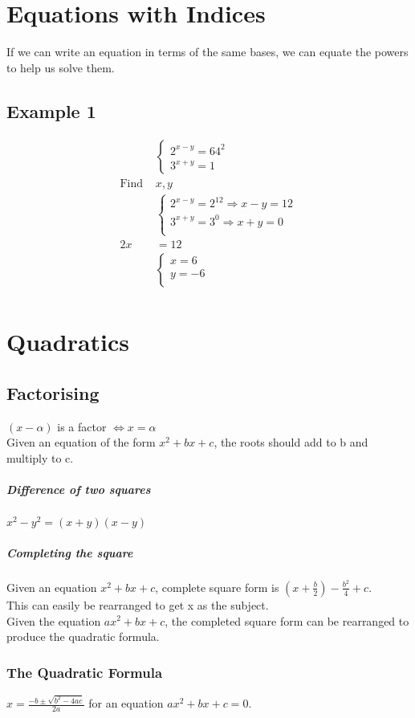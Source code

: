 \documentclass[class=article, crop=false]{standalone}
\begin{document}
\section*{Equations with Indices}
If we can write an equation in terms of the same bases, we can equate the powers to help us solve them.
\subsection*{Example 1}
\begin{align*}
&\begin{cases}
	2^{x-y} = 64^2 \\
	3^{x+y} = 1
\end{cases} \\
\text{Find } &  x, y \\
&\begin{cases}
	2^{x-y} = 2^12 \Rightarrow x-y = 12 \\
	3^{x+y} = 3^0 \Rightarrow x+y = 0 \\
\end{cases} \\
2x & = 12 \\
&\begin{cases}
	x = 6 \\
	y = -6 \\
\end{cases} \\
\end{align*}
\section*{Quadratics}
\subsection*{Factorising}
$(x - \alpha)$ is a factor $\iff x = \alpha$ \\
Given an equation of the form $x^2 + bx + c$, the roots should add to b and multiply to c.
\subparagraph*{Difference of two squares}
$x^2 - y^2 = (x+y)(x-y)$
\subparagraph*{Completing the square}
Given an equation $x^2 + bx + c$, complete square form is $(x + \frac{b}{2}) - \frac{b^2}{4} + c$. \\
This can easily be rearranged to get x as the subject. \\
Given the equation $ax^2 + bx +c$, the completed square form can be rearranged to produce the quadratic formula.
\subsubsection{The Quadratic Formula}
$x = \frac{-b \pm \sqrt{b^2 - 4ac}}{2a}$ for an equation $ax^2 + bx + c = 0$.
\end{document}
